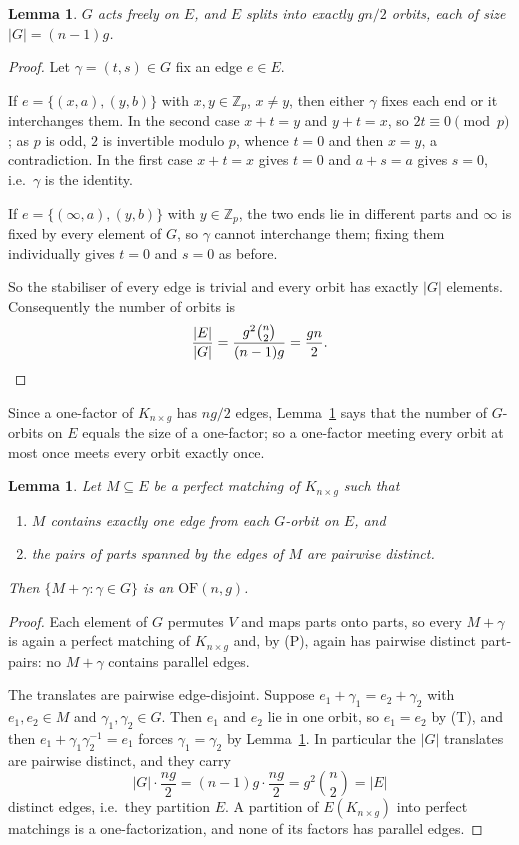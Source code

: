\documentclass[11pt]{amsart}
\newtheorem{lemma}[theorem]{Lemma}
\theoremstyle{remark}
\newcommand{\OF}{\mathrm{OF}}
\newcommand{\Km}[2]{K_{#1\times #2}}
\newcommand{\Zp}{\mathbb Z}
\begin{document}
\begin{lemma}\label{lem:free}
$G$ acts freely on $E$, and $E$ splits into exactly $gn/2$ orbits, each of
size $|G|=(n-1)g$.
\end{lemma}

\begin{proof}
Let $\gamma=(t,s)\in G$ fix an edge $e\in E$.

If $e=\{(x,a),(y,b)\}$ with $x,y\in\Zp_p$, $x\ne y$, then either $\gamma$
fixes each end or it interchanges them. In the second case $x+t=y$ and
$y+t=x$, so $2t\equiv0\pmod p$; as $p$ is odd, $2$ is invertible modulo $p$,
whence $t=0$ and then $x=y$, a contradiction. In the first case $x+t=x$ gives
$t=0$ and $a+s=a$ gives $s=0$, i.e.\ $\gamma$ is the identity.

If $e=\{(\infty,a),(y,b)\}$ with $y\in\Zp_p$, the two ends lie in different
parts and $\infty$ is fixed by every element of $G$, so $\gamma$ cannot
interchange them; fixing them individually gives $t=0$ and $s=0$ as before.

So the stabiliser of every edge is trivial and every orbit has exactly $|G|$
elements. Consequently the number of orbits is
\[
 \frac{|E|}{|G|}
 =\frac{g^2\binom n2}{(n-1)g}
 =\frac{gn}2 . \qedhere
\]
\end{proof}

Since a one-factor of $\Km ng$ has $ng/2$ edges, Lemma~\ref{lem:free} says that
the number of $G$-orbits on $E$ equals the size of a one-factor; so a
one-factor meeting every orbit at most once meets every orbit exactly once.

\begin{lemma}\label{lem:starter}
Let $M\subseteq E$ be a perfect matching of $\Km ng$ such that
\begin{enumerate}
\item[\textup{(T)}] $M$ contains exactly one edge from each $G$-orbit on $E$,
and
\item[\textup{(P)}] the pairs of parts spanned by the edges of $M$ are pairwise
distinct.
\end{enumerate}
Then $\{M+\gamma:\gamma\in G\}$ is an $\OF(n,g)$.
\end{lemma}

\begin{proof}
Each element of $G$ permutes $V$ and maps parts onto parts, so every
$M+\gamma$ is again a perfect matching of $\Km ng$ and, by (P), again has
pairwise distinct part-pairs: no $M+\gamma$ contains parallel edges.

The translates are pairwise edge-disjoint. Suppose
$e_1+\gamma_1=e_2+\gamma_2$ with $e_1,e_2\in M$ and
$\gamma_1,\gamma_2\in G$. Then $e_1$ and $e_2$ lie in one orbit, so $e_1=e_2$
by (T), and then $e_1+\gamma_1\gamma_2^{-1}=e_1$ forces
$\gamma_1=\gamma_2$ by Lemma~\ref{lem:free}. In particular the $|G|$
translates are pairwise distinct, and they carry
\[
 |G|\cdot\frac{ng}2
 =(n-1)g\cdot\frac{ng}2
 =g^2\binom n2
 =|E|
\]
distinct edges, i.e.\ they partition $E$. A partition of $E(\Km ng)$ into
perfect matchings is a one-factorization, and none of its factors has parallel
edges.
\end{proof}
\end{document}
